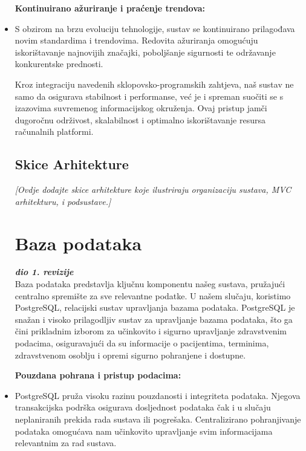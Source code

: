 \begin{itemize}
\textbf{Kontinuirano ažuriranje i praćenje trendova:}
\item S obzirom na brzu evoluciju tehnologije, sustav se kontinuirano prilagođava novim standardima i trendovima. Redovita ažuriranja omogućuju iskorištavanje najnovijih značajki, poboljšanje sigurnosti te održavanje konkurentske prednosti.\newline

Kroz integraciju navedenih sklopovsko-programskih zahtjeva, naš sustav ne samo da osigurava stabilnost i performanse, već je i spreman suočiti se s izazovima suvremenog informacijskog okruženja. Ovaj pristup jamči dugoročnu održivost, skalabilnost i optimalno iskorištavanje resursa računalnih platformi.

 

\subsection*{Skice Arhitekture}
\textit{[Ovdje dodajte skice arhitekture koje ilustriraju organizaciju sustava, MVC arhitekturu, i podsustave.]}

		\section{Baza podataka}
			
			\textbf{\textit{dio 1. revizije}}\\
			
Baza podataka predstavlja ključnu komponentu našeg sustava, pružajući centralno spremište za sve relevantne podatke. U našem slučaju, koristimo PostgreSQL, relacijski sustav upravljanja bazama podataka. PostgreSQL je snažan i visoko prilagodljiv sustav za upravljanje bazama podataka, što ga čini prikladnim izborom za učinkovito i sigurno upravljanje zdravstvenim podacima, osiguravajući da su informacije o pacijentima, terminima, zdravstvenom osoblju i opremi sigurno pohranjene i dostupne. 



\textbf{Pouzdana pohrana i pristup podacima:}
\item PostgreSQL pruža visoku razinu pouzdanosti i integriteta podataka. Njegova transakcijska podrška osigurava dosljednost podataka čak i u slučaju neplaniranih prekida rada sustava ili pogrešaka.
Centralizirano pohranjivanje podataka omogućava nam učinkovito upravljanje svim informacijama relevantnim za rad sustava.


\end{itemize}
